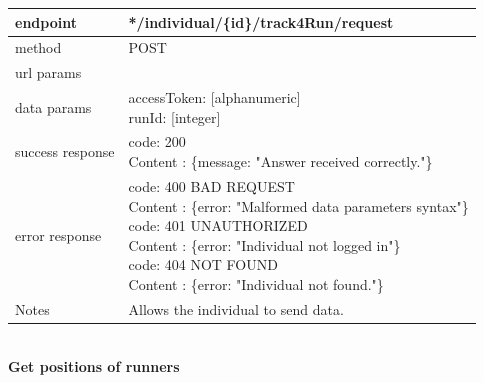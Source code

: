 \begin{legal}
\begin{legal}
\begin{itemize}
								\begin{tabularx}{\linewidth}{| l | l |}
									\hline
									endpoint & */individual/\{id\}/track4Run/request \\
									\hline
									method & POST \\
									\hline
									url params & \\
									\hline
									data params &
									\parbox{0.7\textwidth}{
										\bigskip
										accessToken: [alphanumeric]\\
										runId: [integer]
										\bigskip
									} \\
									\hline
									success response &
									\parbox{0.7\textwidth}{
										\bigskip
										code: 200\\
										Content : \{message: "Answer received correctly."\}
										\bigskip
									} \\
									\hline
									error response &
									\parbox{0.7\textwidth}{
										\bigskip
										code: 400 BAD REQUEST \\
										Content : \{error: "Malformed data parameters syntax"\}\\
										code: 401 UNAUTHORIZED \\
										Content : \{error: "Individual not logged in"\}\\
										code: 404 NOT FOUND \\
										Content : \{error: "Individual not found."\}
										\bigskip
									} \\
									\hline
									Notes & 
									\parbox{0.7\textwidth}{
										\bigskip Allows the individual to send data.
									\bigskip}  \\
									\hline
								\end{tabularx}\\
								
								\textbf{Get positions of runners} \\
			

\end{itemize}
\end{legal}
\end{legal}

